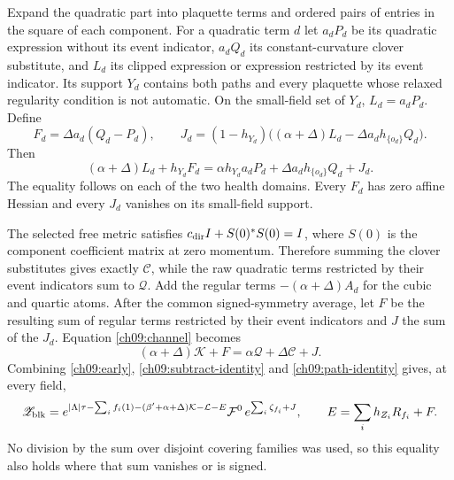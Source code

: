 Expand the quadratic part into plaquette terms and ordered
pairs of entries in the square of each component. For a quadratic term $d$ let
$a_dP_d$ be its quadratic expression without its event indicator, $a_dQ_d$
its constant-curvature clover substitute, and $L_d$ its
clipped expression or expression restricted by its event indicator. Its support $Y_d$
contains both paths and every plaquette whose relaxed regularity condition is not automatic.
On the small-field set of $Y_d$, $L_d=a_dP_d$.
Define
\[
 F_d=\Delta a_d(Q_d-P_d),\qquad
 J_d=(1-h_{Y_d})\bigl((\alpha+\Delta)L_d
                              -\Delta a_dh_{\{o_d\}}Q_d\bigr).
\]
Then
\begin{equation}
 (\alpha+\Delta)L_d+h_{Y_d}F_d
 =\alpha h_{Y_d}a_dP_d+
       \Delta a_dh_{\{o_d\}}Q_d+J_d .
 \label{ch09:channel}
\end{equation}
The equality follows on each of the two health domains.
Every $F_d$ has zero affine Hessian and every $J_d$
vanishes on its small-field support.

The selected free metric satisfies
$c_{\rm dir}I+S(0)^*S(0)=I$, where $S(0)$ is the component
coefficient matrix at zero momentum.
Therefore summing the clover substitutes gives exactly
$\mathcal C$, while the raw quadratic terms restricted by their event indicators sum to
$\mathcal Q$. Add the regular terms
$-(\alpha+\Delta)A_d$ for the cubic and quartic atoms.
After the common signed-symmetry average, let $F$ be the
resulting sum of regular terms restricted by their event indicators and $J$ the sum of the $J_d$.
Equation \eqref{ch09:channel} becomes
\begin{equation}
       (\alpha+\Delta)\mathcal K+F
                   =\alpha\mathcal Q+\Delta\mathcal C+J.
 \label{ch09:path-identity}
\end{equation}
Combining \eqref{ch09:early},
\eqref{ch09:subtract-identity} and
\eqref{ch09:path-identity} gives, at every field,
\begin{equation}
 \mathscr Z_{\rm blk}=
 e^{|\Lambda|\tau-\sum_i f_i(1)
       -(\beta'+\alpha+\Delta)\mathcal K-\mathcal L-E}
       \mathcal F^0\,e^{\sum_i\zeta_{f_i}+J},
 \qquad E=\sum_i h_{Z_i}R_{f_i}+F .
 \label{ch09:before-fusion}
\end{equation}
No division by the sum over disjoint covering families was used, so this equality
also holds where that sum vanishes or is signed.

